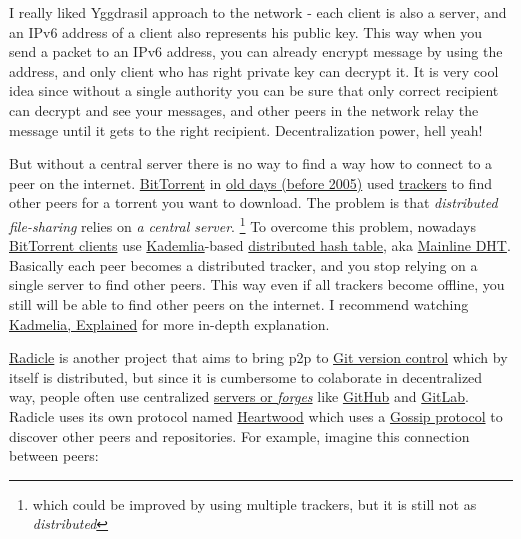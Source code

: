\documentclass[a4paper]{article}
\begin{document}
I really liked Yggdrasil approach to the network -
each client is also a server, and an IPv6 address of a client also represents his public key.
This way when you send a packet to an IPv6 address, you can already encrypt message
by using the address, and only client who has right private key can decrypt it.
It is very cool idea since without a single authority you can be sure
that only correct recipient can decrypt and see your messages, and other peers
in the network relay the message until it gets to the right recipient.
Decentralization power, hell yeah!

But without a central server there is no way to find a way how to connect to a peer on the internet.
\href{https://en.wikipedia.org/wiki/BitTorrent}{BitTorrent}
in \href{https://torrentfreak.com/bittorrents-dht-turns-10-years-old-150607/}{old days (before 2005)}
used \href{https://en.wikipedia.org/wiki/BitTorrent_tracker}{trackers}
to find other peers for a torrent you want to download.
The problem is that \emph{distributed file-sharing} relies on \emph{a central server}.
\footnote{which could be improved by using multiple trackers, but it is still not as \emph{distributed}}
To overcome this problem, nowadays \href{https://en.wikipedia.org/wiki/Comparison_of_BitTorrent_clients}{BitTorrent clients}
use \href{https://en.wikipedia.org/wiki/Kademlia}{Kademlia}-based \href{https://en.wikipedia.org/wiki/Distributed_hash_table}{distributed hash table},
aka \href{https://en.wikipedia.org/wiki/Mainline_DHT}{Mainline DHT}.
Basically each peer becomes a distributed tracker, and you stop relying on a single server to find other peers.
This way even if all trackers become offline, you still will be able to find other peers on the internet.
I recommend watching \href{https://www.youtube.com/watch?v=1QdKhNpsj8M}{Kadmelia, Explained} for more in-depth explanation.

\href{https://radicle.xyz/}{Radicle} is another project that aims to bring
p2p to \href{https://en.wikipedia.org/wiki/Git}{Git version control}
which by itself is distributed, but since it is cumbersome to colaborate
in decentralized way, people often use centralized \href{https://en.wikipedia.org/wiki/Forge_(software)}{servers or \emph{forges}}
like \href{https://github.com/}{GitHub} and \href{https://about.gitlab.com/}{GitLab}.
Radicle uses its own protocol named \href{https://app.radicle.xyz/nodes/iris.radicle.xyz/rad%3Az3gqcJUoA1n9HaHKufZs5FCSGazv5}{Heartwood}
which uses a \href{https://radicle.xyz/guides/protocol}{Gossip protocol} to discover other peers and repositories.
For example, imagine this connection between peers:
\end{document}
